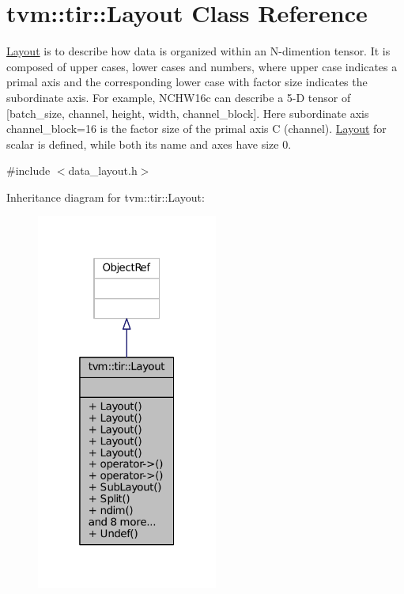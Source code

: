 \hypertarget{classtvm_1_1tir_1_1Layout}{}\section{tvm\+:\+:tir\+:\+:Layout Class Reference}
\label{classtvm_1_1tir_1_1Layout}


\hyperlink{classtvm_1_1tir_1_1Layout}{Layout} is to describe how data is organized within an N-\/dimention tensor. It is composed of upper cases, lower cases and numbers, where upper case indicates a primal axis and the corresponding lower case with factor size indicates the subordinate axis. For example, N\+C\+H\+W16c can describe a 5-\/D tensor of \mbox{[}batch\+\_\+size, channel, height, width, channel\+\_\+block\mbox{]}. Here subordinate axis channel\+\_\+block=16 is the factor size of the primal axis C (channel). \hyperlink{classtvm_1_1tir_1_1Layout}{Layout} for scalar is defined, while both its name and axes have size 0.  




{\ttfamily \#include $<$data\+\_\+layout.\+h$>$}



Inheritance diagram for tvm\+:\+:tir\+:\+:Layout\+:
\nopagebreak
\begin{figure}[H]
\begin{center}
\leavevmode
\includegraphics[width=169pt]{classtvm_1_1tir_1_1Layout__inherit__graph}
\end{center}
\end{figure}


